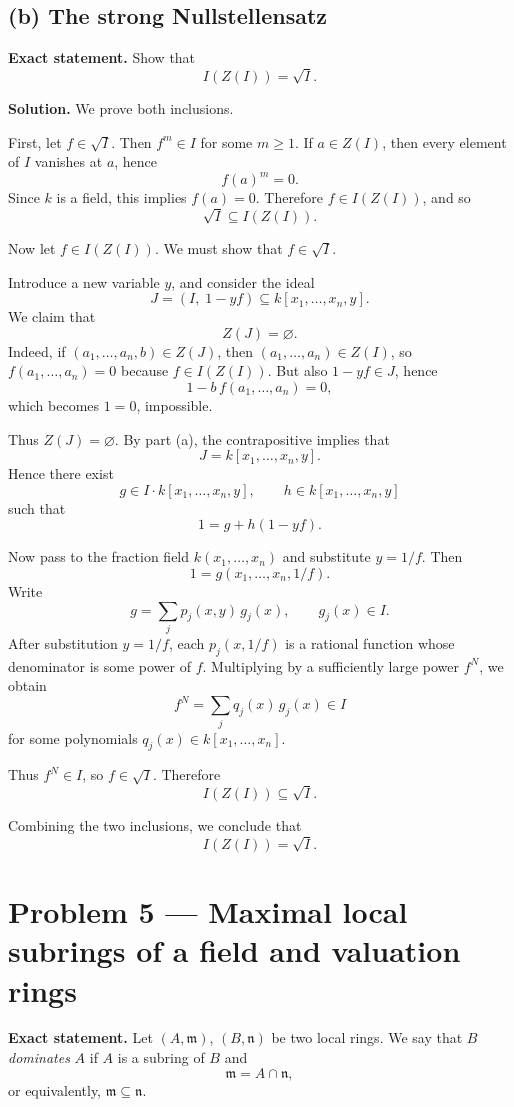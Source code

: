 \documentclass[12pt,a4paper]{article}
\theoremstyle{plain}
\theoremstyle{definition}      %
\begin{document}
\subsection*{(b) The strong Nullstellensatz}

\textbf{Exact statement.}
Show that
\[
I(Z(I))=\sqrt I.
\]

\textbf{Solution.}
We prove both inclusions.

First, let \(f\in \sqrt I\). Then \(f^m\in I\) for some \(m\ge 1\). If \(a\in Z(I)\), then every element of \(I\) vanishes at \(a\), hence
\[
f(a)^m=0.
\]
Since \(k\) is a field, this implies \(f(a)=0\). Therefore \(f\in I(Z(I))\), and so
\[
\sqrt I\subseteq I(Z(I)).
\]

Now let \(f\in I(Z(I))\). We must show that \(f\in \sqrt I\).

Introduce a new variable \(y\), and consider the ideal
\[
J=(I,\;1-yf)\subseteq k[x_1,\dots,x_n,y].
\]
We claim that
\[
Z(J)=\varnothing.
\]
Indeed, if \((a_1,\dots,a_n,b)\in Z(J)\), then \((a_1,\dots,a_n)\in Z(I)\), so \(f(a_1,\dots,a_n)=0\) because \(f\in I(Z(I))\). But also \(1-yf\in J\), hence
\[
1-b\,f(a_1,\dots,a_n)=0,
\]
which becomes \(1=0\), impossible.

Thus \(Z(J)=\varnothing\). By part (a), the contrapositive implies that
\[
J=k[x_1,\dots,x_n,y].
\]
Hence there exist
\[
g\in I\cdot k[x_1,\dots,x_n,y],\qquad h\in k[x_1,\dots,x_n,y]
\]
such that
\[
1=g+h(1-yf).
\]

Now pass to the fraction field \(k(x_1,\dots,x_n)\) and substitute \(y=1/f\). Then
\[
1=g(x_1,\dots,x_n,1/f).
\]
Write
\[
g=\sum_j p_j(x,y)\,g_j(x),
\qquad g_j(x)\in I.
\]
After substitution \(y=1/f\), each \(p_j(x,1/f)\) is a rational function whose denominator is some power of \(f\). Multiplying by a sufficiently large power \(f^N\), we obtain
\[
f^N=\sum_j q_j(x)\,g_j(x)\in I
\]
for some polynomials \(q_j(x)\in k[x_1,\dots,x_n]\).

Thus \(f^N\in I\), so \(f\in \sqrt I\). Therefore
\[
I(Z(I))\subseteq \sqrt I.
\]

Combining the two inclusions, we conclude that
\[
I(Z(I))=\sqrt I.
\]

\bigskip

\section*{Problem 5 --- Maximal local subrings of a field and valuation rings}

\textbf{Exact statement.}
Let \((A,\mathfrak m)\), \((B,\mathfrak n)\) be two local rings. We say that \(B\) \emph{dominates} \(A\) if \(A\) is a subring of \(B\) and
\[
\mathfrak m=A\cap \mathfrak n,
\]
or equivalently, \(\mathfrak m\subseteq \mathfrak n\).
\end{document}
